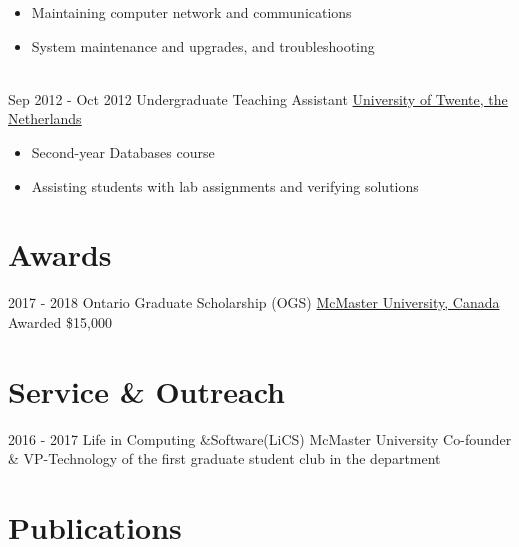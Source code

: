 \documentclass[letterpaper]{twentysecondcv} %
\begin{document}
\begin{twenty}
{\begin{itemize}
			\item Maintaining computer network and communications
			\item System maintenance and upgrades, and troubleshooting
	\end{itemize}}
	\\
	\twentyitem
	{Sep 2012 -}
	{Oct 2012}
	{Undergraduate Teaching Assistant}
	{\href{https://www.utwente.nl/}{University of Twente, the Netherlands}}
	{}
	{\begin{itemize}
			\item Second-year Databases course
			\item Assisting students with lab assignments and verifying solutions
	\end{itemize}}
	
\end{twenty} 
\vspace{-.5em}
\section{Awards}

\vspace{-.5em}
\begin{twenty}
\twentyitem
	{2017 -}
	{2018}
	{Ontario Graduate Scholarship (OGS)}
	{\href{https://www.mcmaster.ca/}{McMaster University, Canada}}
	{}
	{Awarded \$15,000}
\end{twenty}

\vspace{-.5em}
\section{Service \& Outreach}
\vspace{-.5em}
\begin{twenty}
	\twentyitem
	{2016 -}
	{2017}
	{Life in Computing \&Software(LiCS)}
	{McMaster University}
	{}
	{Co-founder \& VP-Technology of the first graduate student club in the department}
\end{twenty}

\vspace{-.5em}
\section{Publications}
\vspace{-.5em}
\printbibliography[heading=none]
\end{document}
